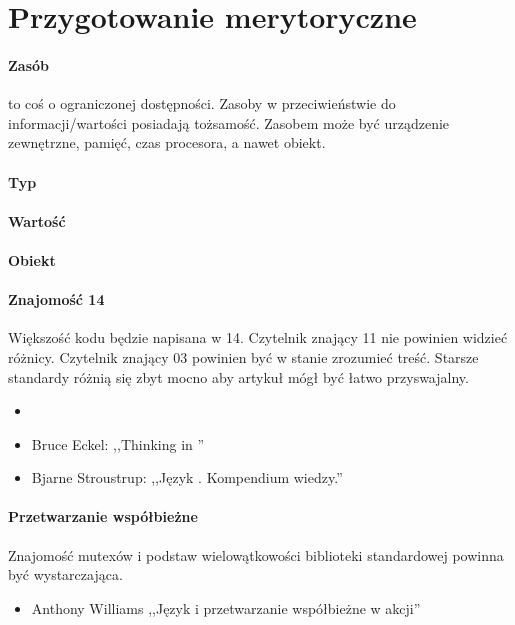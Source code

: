 \section{Przygotowanie merytoryczne}\label{sec:reader-profile}
\paragraph{Zasób}
 to coś o ograniczonej dostępności. Zasoby w przeciwieństwie do informacji/wartości posiadają tożsamość. Zasobem może być urządzenie zewnętrzne, pamięć, czas procesora, a nawet obiekt.

\paragraph{Typ}

\paragraph{Wartość}

\paragraph{Obiekt}

\paragraph{Znajomość \Cpp{}14}
Większość kodu będzie napisana w \Cpp{}14. Czytelnik znający \Cpp{}11 nie powinien widzieć różnicy. Czytelnik znający \Cpp{}03 powinien być w stanie zrozumieć treść. Starsze standardy różnią się zbyt mocno aby artykuł mógł być łatwo przyswajalny.
\begin{itemize}
\item {}
\item Bruce Eckel: ,,Thinking in \Cpp''
\item Bjarne Stroustrup: ,,Język \Cpp. Kompendium wiedzy.''
\end{itemize}

\paragraph{Przetwarzanie współbieżne}
Znajomość mutexów i podstaw wielowątkowości biblioteki standardowej \Cpp{} powinna być wystarczająca.
\begin{itemize}
\item Anthony Williams ,,Język \Cpp{} i przetwarzanie współbieżne w akcji''
\end{itemize}

